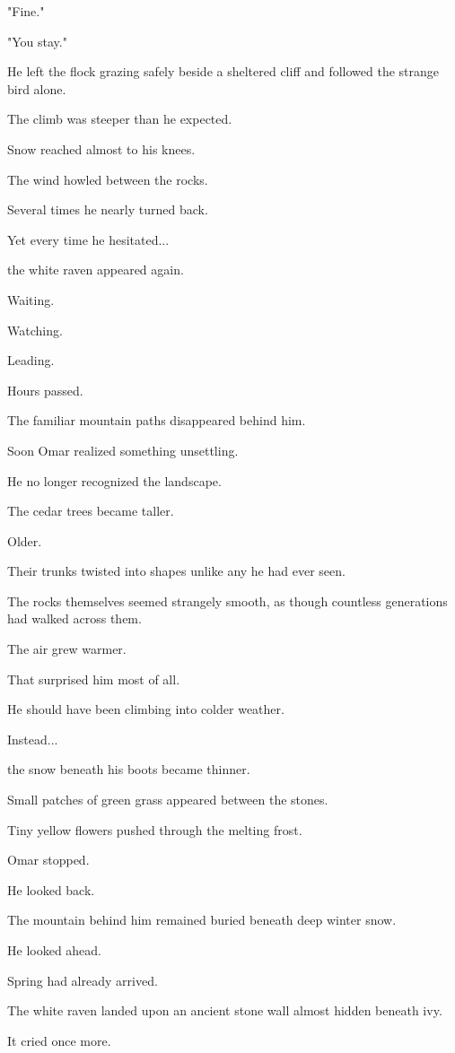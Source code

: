 \documentclass[12pt,openany]{book}
\begin{document}
"Fine."

"You stay."

He left the flock grazing safely beside a sheltered cliff and followed the strange bird alone.

The climb was steeper than he expected.

Snow reached almost to his knees.

The wind howled between the rocks.

Several times he nearly turned back.

Yet every time he hesitated...

the white raven appeared again.

Waiting.

Watching.

Leading.

Hours passed.

The familiar mountain paths disappeared behind him.

Soon Omar realized something unsettling.

He no longer recognized the landscape.

The cedar trees became taller.

Older.

Their trunks twisted into shapes unlike any he had ever seen.

The rocks themselves seemed strangely smooth, as though countless generations had walked across them.

The air grew warmer.

That surprised him most of all.

He should have been climbing into colder weather.

Instead...

the snow beneath his boots became thinner.

Small patches of green grass appeared between the stones.

Tiny yellow flowers pushed through the melting frost.

Omar stopped.

He looked back.

The mountain behind him remained buried beneath deep winter snow.

He looked ahead.

Spring had already arrived.

The white raven landed upon an ancient stone wall almost hidden beneath ivy.

It cried once more.
\end{document}

